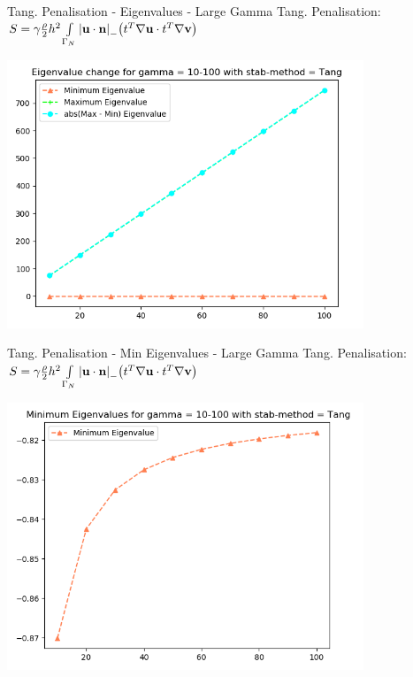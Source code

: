 \begin{frame}{Tang. Penalisation - Eigenvalues - Large Gamma}
    Tang. Penalisation: \(
      S = \gamma\frac{\rho}{2}h^{2}\int\limits_{\Gamma_{N}} \abs{{\textbf{u}} \cdot {\textbf{n}} }_- \qty(t^{T}\nabla{\textbf{u}} \cdot t^{T}\nabla{\textbf{v}})
      \)
    \begin{center}
        \includegraphics[width=0.8\textwidth]{Media/Gamma_10_thru_100_tang.png}
    \end{center}
\end{frame}

\begin{frame}{Tang. Penalisation - Min Eigenvalues - Large Gamma}
    Tang. Penalisation: \(
      S = \gamma\frac{\rho}{2}h^{2}\int\limits_{\Gamma_{N}} \abs{{\textbf{u}} \cdot {\textbf{n}} }_- \qty(t^{T}\nabla{\textbf{u}} \cdot t^{T}\nabla{\textbf{v}})
      \)
    \begin{center}
        \includegraphics[width=0.8\textwidth]{Media/Gamma_10_thru_100_tang_min.png}
    \end{center}
\end{frame}

